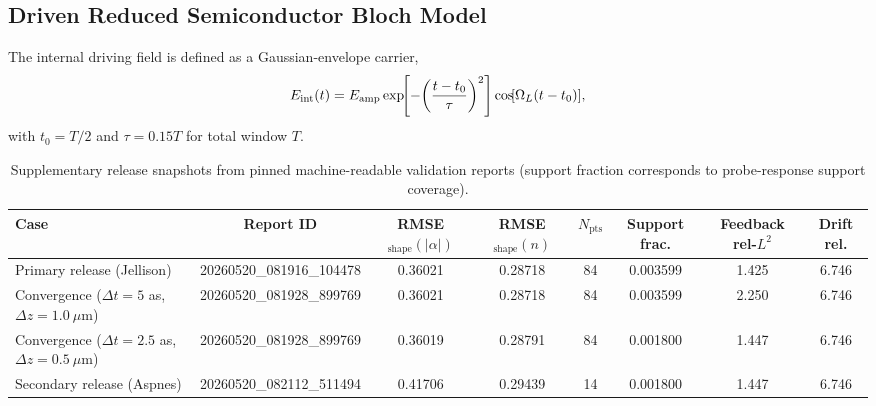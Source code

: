 \documentclass[aps,pra,twocolumn,reprint,superscriptaddress,nofootinbib]{revtex4-2}
\let\originalleft\left
\let\originalright\right
\renewcommand{\left}{\mathopen{}\mathclose\bgroup\originalleft}
\renewcommand{\right}{\aftergroup\egroup\originalright}
\begin{document}
\subsection{Driven Reduced Semiconductor Bloch Model}
The internal driving field is defined as a Gaussian-envelope carrier,
\begin{align}
E_{\mathrm{int}}(t)
= E_{\mathrm{amp}}
\exp\!\left[-\left(\frac{t-t_0}{\tau}\right)^2\right]
\cos\!\left[\Omega_L(t-t_0)\right],
\end{align}
with $t_0=T/2$ and $\tau=0.15T$ for total window $T$.



\begin{table}[t]
\centering
\caption{
Supplementary release snapshots from pinned machine-readable validation reports
(support fraction corresponds to probe-response support coverage).
}
\label{tab:appendix_validation}
\small
\setlength{\tabcolsep}{3pt}
\begin{tabular}{lccccccc}
\toprule
Case & Report ID & RMSE$_{\mathrm{shape}}(|\alpha|)$ & RMSE$_{\mathrm{shape}}(n)$ & $N_{\mathrm{pts}}$ & Support frac. & Feedback rel-$L^2$ & Drift rel. \\
\midrule
Primary release (Jellison) & 20260520\_081916\_104478 & 0.36021 & 0.28718 & 84 & 0.003599 & 1.425 & 6.746 \\
Convergence ($\Delta t=5$ as, $\Delta z=1.0~\mu$m) & 20260520\_081928\_899769 & 0.36021 & 0.28718 & 84 & 0.003599 & 2.250 & 6.746 \\
Convergence ($\Delta t=2.5$ as, $\Delta z=0.5~\mu$m) & 20260520\_081928\_899769 & 0.36019 & 0.28791 & 84 & 0.001800 & 1.447 & 6.746 \\
Secondary release (Aspnes) & 20260520\_082112\_511494 & 0.41706 & 0.29439 & 14 & 0.001800 & 1.447 & 6.746 \\
\bottomrule
\end{tabular}
\end{table}
\setlength{\tabcolsep}{6pt}
\end{document}

